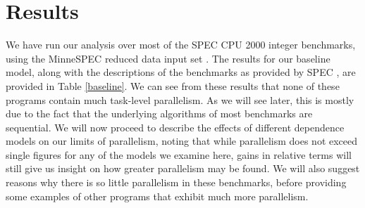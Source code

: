 \section{Results} \label{sresults}

We have run our analysis over most of the SPEC CPU 2000 integer benchmarks, using the MinneSPEC reduced data input set \cite{KleinOsowski02minnespec}.
The results for our baseline model, along with the descriptions of the benchmarks as provided by SPEC \cite{henning00spec}, are provided in Table \ref{baseline}.
We can see from these results that none of these programs contain much task-level parallelism.
As we will see later, this is mostly due to the fact that the underlying algorithms of most benchmarks are sequential.
We will now proceed to describe the effects of different dependence models on our limits of parallelism, noting that while parallelism does not exceed single figures for any of the models we examine here, gains in relative terms will still give us insight on how greater parallelism may be found.
We will also suggest reasons why there is so little parallelism in these benchmarks, before providing some examples of other programs that exhibit much more parallelism.

